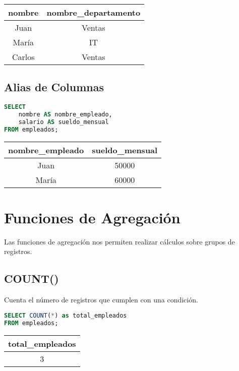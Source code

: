 \documentclass[12pt]{article}
\begin{document}
\begin{center}
\begin{tabular}{cc}
\toprule
nombre & nombre\_departamento \\
\midrule
Juan & Ventas \\
María & IT \\
Carlos & Ventas \\
\bottomrule
\end{tabular}
\end{center}

\subsection{Alias de Columnas}
\begin{lstlisting}[language=SQL]
SELECT 
    nombre AS nombre_empleado,
    salario AS sueldo_mensual
FROM empleados;
\end{lstlisting}

\begin{center}
\begin{tabular}{cc}
\toprule
nombre\_empleado & sueldo\_mensual \\
\midrule
Juan & 50000 \\
María & 60000 \\
\bottomrule
\end{tabular}
\end{center}

\section{Funciones de Agregación}
Las funciones de agregación nos permiten realizar cálculos sobre grupos de registros.

\subsection{COUNT()}
Cuenta el número de registros que cumplen con una condición.

\begin{lstlisting}[language=SQL]
SELECT COUNT(*) as total_empleados
FROM empleados;
\end{lstlisting}

\begin{center}
\begin{tabular}{c}
\toprule
total\_empleados \\
\midrule
3 \\
\bottomrule
\end{tabular}
\end{center}
\end{document}
